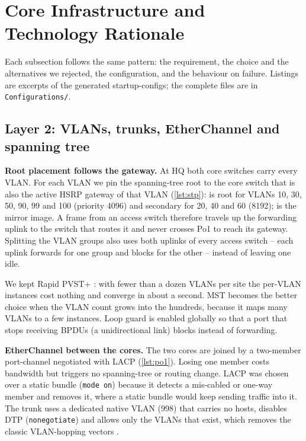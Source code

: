 \section{Core Infrastructure and Technology Rationale}\label{sec:core}

Each subsection follows the same pattern: the requirement, the choice and the alternatives we rejected,
the configuration, and the behaviour on failure. Listings are excerpts of the generated startup-configs;
the complete files are in \texttt{Configurations/}.

\subsection{Layer 2: VLANs, trunks, EtherChannel and spanning tree}\label{sec:l2}
\textbf{Root placement follows the gateway.} At HQ both core switches carry every VLAN. For each VLAN we
pin the spanning-tree root to the core switch that is also the active HSRP gateway of that VLAN
(\cref{lst:stp}):  is root for VLANs 10, 30, 50, 90, 99 and 100 (priority 4096) and
secondary for 20, 40 and 60 (8192);  is the mirror image. A frame from an access switch
therefore travels up the forwarding uplink to the switch that routes it and never crosses Po1 to reach
its gateway. Splitting the VLAN groups also uses both uplinks of every access switch -- each uplink
forwards for one group and blocks for the other -- instead of leaving one idle.


We kept Rapid PVST+ \cite{ieee8021d}: with fewer than a dozen VLANs per site the per-VLAN instances cost
nothing and converge in about a second. MST becomes the better choice when the VLAN count grows into the
hundreds, because it maps many VLANs to a few instances. Loop guard is enabled globally so that a port that
stops receiving BPDUs (a unidirectional link) blocks instead of forwarding.

\textbf{EtherChannel between the cores.} The two cores are joined by a two-member port-channel negotiated
with LACP \cite{ieee8021ax} (\cref{lst:po1}). Losing one member costs bandwidth but triggers no
spanning-tree or routing change. LACP was chosen over a static bundle (\texttt{mode on}) because it detects a
mis-cabled or one-way member and removes it, where a static bundle would keep sending traffic into it. The
trunk uses a dedicated native VLAN (998) that carries no hosts, disables DTP (\texttt{nonegotiate}) and
allows only the VLANs that exist, which removes the classic VLAN-hopping vectors \cite{ieee8021q}.

